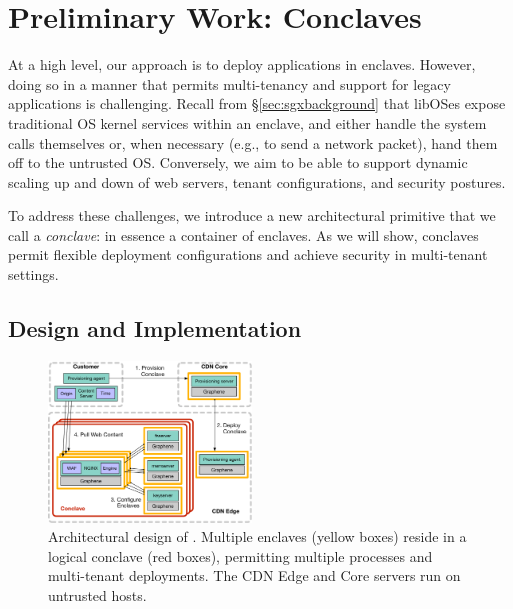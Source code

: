 \section{Preliminary Work: Conclaves}
\label{sec:conclaves-summary}
%

At a high level, our approach is to deploy applications in enclaves.
%
However, doing so in a manner that permits multi-tenancy and support
for legacy applications is challenging.
%
%
Recall from \S\ref{sec:sgxbackground} that libOSes expose traditional
OS kernel services within an enclave, and either handle the system calls
themselves or, when necessary (e.g., to send a network packet), hand
them off to the untrusted OS.
%
Conversely, we aim to be able to support dynamic scaling up and down of
web servers, tenant configurations, and security postures.

To address these challenges, we introduce a new architectural primitive that we
call a \emph{conclave}: in essence a container of enclaves.
%
As we will show, conclaves permit flexible deployment configurations and
achieve security in multi-tenant settings.


\subsection{Design and Implementation}


\begin{figure}
\centering
\includegraphics[width=0.48\textwidth]{figs/phoenix-design}
	\caption{Architectural design of \name. Multiple enclaves (yellow
	boxes) reside in a logical conclave (red boxes), permitting
	multiple processes and multi-tenant deployments. The CDN Edge and
	Core servers run on untrusted hosts.}
\label{fig:design}
\end{figure}


